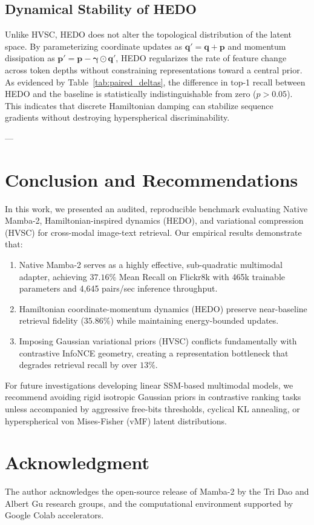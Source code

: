 \documentclass[journal]{IEEEtran}
\begin{document}
\subsection{Dynamical Stability of HEDO}
Unlike HVSC, HEDO does not alter the topological distribution of the latent space. By parameterizing coordinate updates as $\mathbf{q}' = \mathbf{q} + \mathbf{p}$ and momentum dissipation as $\mathbf{p}' = \mathbf{p} - \boldsymbol{\gamma} \odot \mathbf{q}'$, HEDO regularizes the rate of feature change across token depths without constraining representations toward a central prior. As evidenced by Table~\ref{tab:paired_deltas}, the difference in top-1 recall between HEDO and the baseline is statistically indistinguishable from zero ($p > 0.05$). This indicates that discrete Hamiltonian damping can stabilize sequence gradients without destroying hyperspherical discriminability.

---

\section{Conclusion and Recommendations}
In this work, we presented an audited, reproducible benchmark evaluating Native Mamba-2, Hamiltonian-inspired dynamics (HEDO), and variational compression (HVSC) for cross-modal image-text retrieval. Our empirical results demonstrate that:
\begin{enumerate}
    \item Native Mamba-2 serves as a highly effective, sub-quadratic multimodal adapter, achieving $37.16\%$ Mean Recall on Flickr8k with 465k trainable parameters and 4,645 pairs/sec inference throughput.
    \item Hamiltonian coordinate-momentum dynamics (HEDO) preserve near-baseline retrieval fidelity ($35.86\%$) while maintaining energy-bounded updates.
    \item Imposing Gaussian variational priors (HVSC) conflicts fundamentally with contrastive InfoNCE geometry, creating a representation bottleneck that degrades retrieval recall by over $13\%$.
\end{enumerate}
For future investigations developing linear SSM-based multimodal models, we recommend avoiding rigid isotropic Gaussian priors in contrastive ranking tasks unless accompanied by aggressive free-bits thresholds, cyclical KL annealing, or hyperspherical von Mises-Fisher (vMF) latent distributions.

\section*{Acknowledgment}
The author acknowledges the open-source release of Mamba-2 by the Tri Dao and Albert Gu research groups, and the computational environment supported by Google Colab accelerators.



\end{document}
